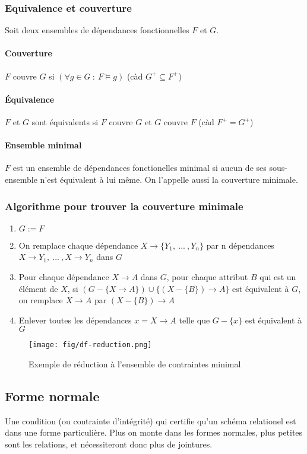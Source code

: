 \documentclass[a4paper]{article}
\begin{document}
\subsubsection{Equivalence et couverture}
Soit deux ensembles de dépendances fonctionnelles $F$ et $G$.
\paragraph{Couverture} $F$ couvre $G$ si $(\forall g \in G~:~F \models g)$ (càd $G^+ \subseteq F^+$)
\paragraph{\'Equivalence} $F$ et $G$ sont équivalents si $F$ couvre $G$ et $G$ couvre $F$ (càd $F^+ = G^+$)
\paragraph{Ensemble minimal} $F$ est un ensemble de dépendances fonctionelles minimal
si aucun de ses sous-ensemble n'est équivalent à lui même. On l'appelle aussi la
couverture minimale.

\subsubsection{Algorithme pour trouver la couverture minimale}
\begin{enumerate}
  \item $G := F$
  \item On remplace chaque dépendance $X \rightarrow \{Y_1,~...~,Y_n\}$ par n dépendances
        $X \rightarrow Y_1,~...~, X \rightarrow Y_n$ dans $G$
  \item Pour chaque dépendance $X \rightarrow A$ dans $G$, pour chaque attribut $B$
        qui est un élément de $X$, si $(G-\{X\rightarrow A\})\cup\{(X-\{B\}) \rightarrow A\}$ est
        équivalent à $G$, on remplace $X \rightarrow A $ par $(X-\{B\}) \rightarrow A$
  \item Enlever toutes les dépendances $x = X \rightarrow A$ telle que $G-\{x\}$ est équivalent à $G$ 
\end{enumerate}

\begin{figure}[H]
\center
\texttt{[image: fig/df-reduction.png]}
\caption{Exemple de réduction à l'ensemble de contraintes minimal}
\end{figure}

\subsection{Forme normale}
Une condition (ou contrainte d'intégrité) qui certifie qu'un schéma relationel
est dans une forme particulière. Plus on monte dans les formes normales, plus petites
sont les relations, et nécessiteront donc plus de jointures.
\end{document}

